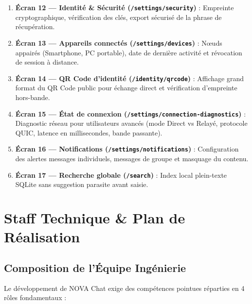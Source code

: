 \documentclass[11pt,a4paper]{article}
\begin{document}
\begin{enumerate}
    \item \textbf{Écran 12 — Identité \& Sécurité (\texttt{/settings/security})} : Empreinte cryptographique, vérification des clés, export sécurisé de la phrase de récupération.
    \item \textbf{Écran 13 — Appareils connectés (\texttt{/settings/devices})} : Nœuds appairés (Smartphone, PC portable), date de dernière activité et révocation de session à distance.
    \item \textbf{Écran 14 — QR Code d'identité (\texttt{/identity/qrcode})} : Affichage grand format du QR Code public pour échange direct et vérification d'empreinte hors-bande.
    \item \textbf{Écran 15 — État de connexion (\texttt{/settings/connection-diagnostics})} : Diagnostic réseau pour utilisateurs avancés (mode Direct vs Relayé, protocole QUIC, latence en millisecondes, bande passante).
    \item \textbf{Écran 16 — Notifications (\texttt{/settings/notifications})} : Configuration des alertes messages individuels, messages de groupe et masquage du contenu.
    \item \textbf{Écran 17 — Recherche globale (\texttt{/search})} : Index local plein-texte SQLite sans suggestion parasite avant saisie.
\end{enumerate}

\vspace{0.3cm}

\section{Staff Technique \& Plan de Réalisation}

\subsection{Composition de l'Équipe Ingénierie}
Le développement de NOVA Chat exige des compétences pointues réparties en 4 rôles fondamentaux :
\end{document}
